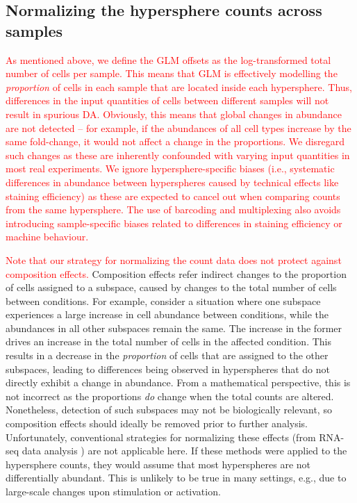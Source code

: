 \documentclass{article}
\newcommand\revised[1]{\textcolor{red}{#1}}
\begin{document}
\subsection{Normalizing the hypersphere counts across samples}
\revised{As mentioned above, we define the GLM offsets as the log-transformed total number of cells per sample.
This means that GLM is effectively modelling the \textit{proportion} of cells in each sample that are located inside each hypersphere.
Thus, differences in the input quantities of cells between different samples will not result in spurious DA.
Obviously, this means that global changes in abundance are not detected -- for example, if the abundances of all cell types increase by the same fold-change, it would not affect a change in the proportions.
We disregard such changes as these are inherently confounded with varying input quantities in most real experiments.
We ignore hypersphere-specific biases (i.e., systematic differences in abundance between hyperspheres caused by technical effects like staining efficiency) as these are expected to cancel out when comparing counts from the same hypersphere.
The use of barcoding and multiplexing also avoids introducing sample-specific biases related to differences in staining efficiency or machine behaviour.}


\revised{Note that our strategy for normalizing the count data does not protect against composition effects.}
Composition effects refer indirect changes to the proportion of cells assigned to a subspace, caused by changes to the total number of cells between conditions.
For example, consider a situation where one subspace experiences a large increase in cell abundance between conditions, while the abundances in all other subspaces remain the same.
The increase in the former drives an increase in the total number of cells in the affected condition.
This results in a decrease in the \textit{proportion} of cells that are assigned to the other subspaces, leading to differences being observed in hyperspheres that do not directly exhibit a change in abundance.
From a mathematical perspective, this is not incorrect as the proportions \textit{do} change when the total counts are altered.
Nonetheless, detection of such subspaces may not be biologically relevant, so composition effects should ideally be removed prior to further analysis.
Unfortunately, conventional strategies for normalizing these effects (from RNA-seq data analysis \cite{robinson2010scaling}) are not applicable here.
If these methods were applied to the hypersphere counts, they would assume that most hyperspheres are not differentially abundant.
This is unlikely to be true in many settings, e.g., due to large-scale changes upon stimulation or activation.
\end{document}
